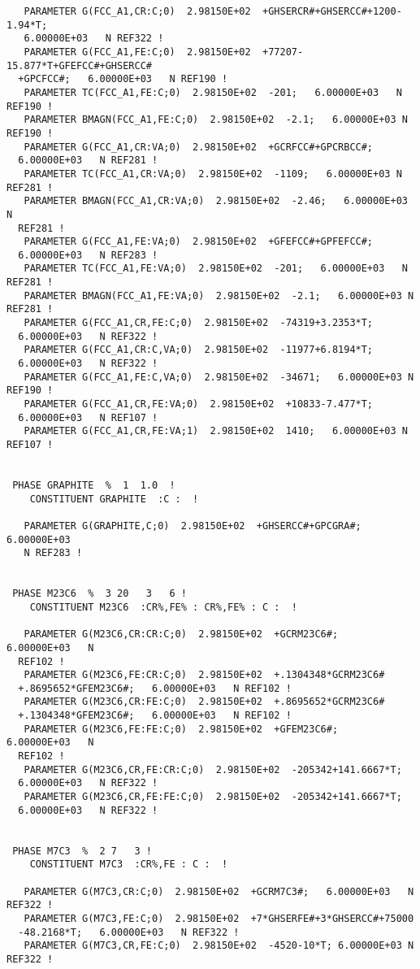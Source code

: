 \documentclass[12pt]{article}
\begin{document}
\begin{verbatim}
   PARAMETER G(FCC_A1,CR:C;0)  2.98150E+02  +GHSERCR#+GHSERCC#+1200-1.94*T;  
   6.00000E+03   N REF322 !
   PARAMETER G(FCC_A1,FE:C;0)  2.98150E+02  +77207-15.877*T+GFEFCC#+GHSERCC#
  +GPCFCC#;   6.00000E+03   N REF190 !
   PARAMETER TC(FCC_A1,FE:C;0)  2.98150E+02  -201;   6.00000E+03   N REF190 !
   PARAMETER BMAGN(FCC_A1,FE:C;0)  2.98150E+02  -2.1;   6.00000E+03 N REF190 !
   PARAMETER G(FCC_A1,CR:VA;0)  2.98150E+02  +GCRFCC#+GPCRBCC#;   
  6.00000E+03   N REF281 !
   PARAMETER TC(FCC_A1,CR:VA;0)  2.98150E+02  -1109;   6.00000E+03 N   REF281 !
   PARAMETER BMAGN(FCC_A1,CR:VA;0)  2.98150E+02  -2.46;   6.00000E+03   N 
  REF281 !
   PARAMETER G(FCC_A1,FE:VA;0)  2.98150E+02  +GFEFCC#+GPFEFCC#;   
  6.00000E+03   N REF283 !
   PARAMETER TC(FCC_A1,FE:VA;0)  2.98150E+02  -201;   6.00000E+03   N REF281 !
   PARAMETER BMAGN(FCC_A1,FE:VA;0)  2.98150E+02  -2.1;   6.00000E+03 N REF281 !
   PARAMETER G(FCC_A1,CR,FE:C;0)  2.98150E+02  -74319+3.2353*T;   
  6.00000E+03   N REF322 !
   PARAMETER G(FCC_A1,CR:C,VA;0)  2.98150E+02  -11977+6.8194*T;   
  6.00000E+03   N REF322 !
   PARAMETER G(FCC_A1,FE:C,VA;0)  2.98150E+02  -34671;   6.00000E+03 N REF190 !
   PARAMETER G(FCC_A1,CR,FE:VA;0)  2.98150E+02  +10833-7.477*T;   
  6.00000E+03   N REF107 !
   PARAMETER G(FCC_A1,CR,FE:VA;1)  2.98150E+02  1410;   6.00000E+03 N  REF107 !


 PHASE GRAPHITE  %  1  1.0  !
    CONSTITUENT GRAPHITE  :C :  !

   PARAMETER G(GRAPHITE,C;0)  2.98150E+02  +GHSERCC#+GPCGRA#;   6.00000E+03  
   N REF283 !


 PHASE M23C6  %  3 20   3   6 !
    CONSTITUENT M23C6  :CR%,FE% : CR%,FE% : C :  !

   PARAMETER G(M23C6,CR:CR:C;0)  2.98150E+02  +GCRM23C6#;   6.00000E+03   N 
  REF102 !
   PARAMETER G(M23C6,FE:CR:C;0)  2.98150E+02  +.1304348*GCRM23C6#
  +.8695652*GFEM23C6#;   6.00000E+03   N REF102 !
   PARAMETER G(M23C6,CR:FE:C;0)  2.98150E+02  +.8695652*GCRM23C6#
  +.1304348*GFEM23C6#;   6.00000E+03   N REF102 !
   PARAMETER G(M23C6,FE:FE:C;0)  2.98150E+02  +GFEM23C6#;   6.00000E+03   N 
  REF102 !
   PARAMETER G(M23C6,CR,FE:CR:C;0)  2.98150E+02  -205342+141.6667*T;   
  6.00000E+03   N REF322 !
   PARAMETER G(M23C6,CR,FE:FE:C;0)  2.98150E+02  -205342+141.6667*T;   
  6.00000E+03   N REF322 !


 PHASE M7C3  %  2 7   3 !
    CONSTITUENT M7C3  :CR%,FE : C :  !

   PARAMETER G(M7C3,CR:C;0)  2.98150E+02  +GCRM7C3#;   6.00000E+03   N REF322 !
   PARAMETER G(M7C3,FE:C;0)  2.98150E+02  +7*GHSERFE#+3*GHSERCC#+75000
  -48.2168*T;   6.00000E+03   N REF322 !
   PARAMETER G(M7C3,CR,FE:C;0)  2.98150E+02  -4520-10*T; 6.00000E+03 N REF322 !



\end{verbatim}
\end{document}

